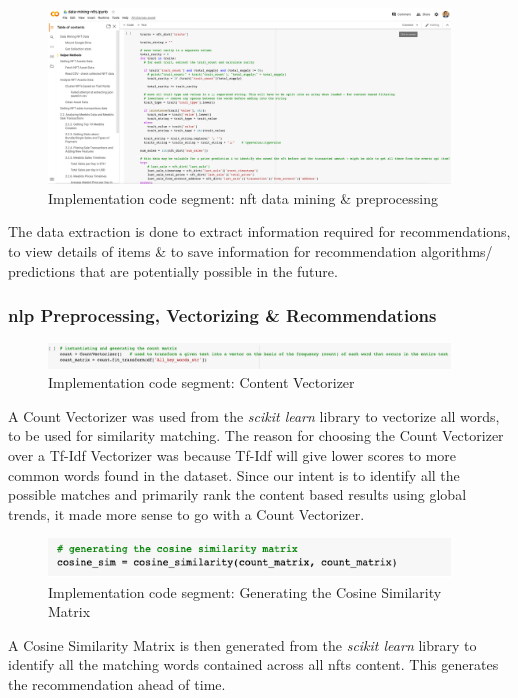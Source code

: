 \begin{figure}[h!]
\centering
\includegraphics[width=0.95\textwidth]{images/Implementation/code/nft-data-extraction.png}
\caption{Implementation code segment: \gls{nft} data mining \& preprocessing}
\label{fig:code-nft-data-mining}
\end{figure}

\vspace{-6mm}
The data extraction is done to extract information required for recommendations, to view details of items \& to save information for recommendation algorithms/ predictions that are potentially possible in the future.

\subsubsection{\gls{nlp} Preprocessing, Vectorizing \& Recommendations}

\begin{figure}[h!]
\centering
\includegraphics[width=0.95\textwidth]{images/Implementation/code/content vectorizer.png}
\caption{Implementation code segment: Content Vectorizer}
\label{fig:code-content-vectorizer}
\end{figure}

A Count Vectorizer was used from the \textit{scikit learn} library to vectorize all words, to be used for similarity matching. The reason for choosing the Count Vectorizer over a Tf-Idf Vectorizer was because Tf-Idf will give lower scores to more common words found in the dataset. Since our intent is to identify all the possible matches and primarily rank the content based results using global trends, it made more sense to go with a Count Vectorizer.

\begin{figure}[h!]
\centering
\includegraphics[width=0.95\textwidth]{images/Implementation/code/cosine-matrix.png}
\caption{Implementation code segment: Generating the Cosine Similarity Matrix}
\label{fig:code-cosine-matrix}
\end{figure}
A Cosine Similarity Matrix is then generated from the \textit{scikit learn} library to identify all the matching words contained across all \gls{nft}s content. This generates the recommendation ahead of time.

